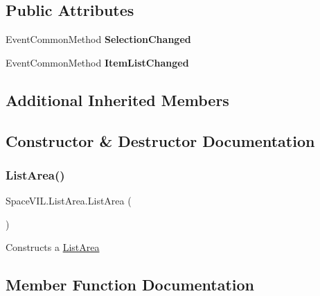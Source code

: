\subsection*{Public Attributes}
\begin{DoxyCompactItemize}
\item 
\mbox{\label{class_space_v_i_l_1_1_list_area_abc77028057292a1e4bd149a4ab5e78ff}} 
Event\+Common\+Method {\bfseries Selection\+Changed}
\item 
\mbox{\label{class_space_v_i_l_1_1_list_area_a30e7266ebd685af3f12f386250b07689}} 
Event\+Common\+Method {\bfseries Item\+List\+Changed}
\end{DoxyCompactItemize}
\subsection*{Additional Inherited Members}


\subsection{Constructor \& Destructor Documentation}
\mbox{\label{class_space_v_i_l_1_1_list_area_a9ff09f668b7bbb22943905402aaa5938}} 
\subsubsection{\texorpdfstring{List\+Area()}{ListArea()}}
{\footnotesize\ttfamily Space\+V\+I\+L.\+List\+Area.\+List\+Area (\begin{DoxyParamCaption}{ }\end{DoxyParamCaption})}



Constructs a \mbox{\hyperlink{class_space_v_i_l_1_1_list_area}{List\+Area}} 



\subsection{Member Function Documentation}
\mbox{\label{class_space_v_i_l_1_1_list_area_a31bfa40ca257cb8d2709f1b0b15fea71}} 
